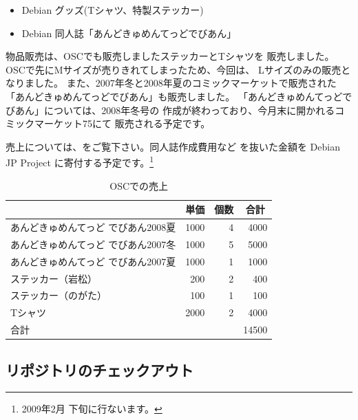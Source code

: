 \documentclass[mingoth,a4paper]{jsarticle}
\begin{document}
\begin{itemize}
 \item Debian グッズ(Tシャツ、特製ステッカー)
 \item Debian 同人誌「あんどきゅめんてっどでびあん」 
\end{itemize}

物品販売は、OSCでも販売しましたステッカーとTシャツを
販売しました。
OSCで先にMサイズが売りきれてしまったため、今回は、
Lサイズのみの販売となりました。
また、2007年冬と2008年夏のコミックマーケットで販売された
「あんどきゅめんてっどでびあん」も販売しました。
「あんどきゅめんてっどでびあん」については、2008年冬号の
作成が終わっており、今月末に開かれるコミックマーケット75にて
販売される予定です。

売上については、をご覧下さい。同人誌作成費用など
を抜いた金額を Debian JP Project に寄付する予定です。\footnote{2009年2月
下旬に行ないます。}

\begin{table}[htbp]
\caption{OSCでの売上}
\begin{center}
\begin{tabular}{|l|r|r|r|}
\hline
\multicolumn{1}{|c|}{} & \multicolumn{1}{c|}{単価} & \multicolumn{1}{c|}{個数} & \multicolumn{1}{c|}{合計} \\ \hline
あんどきゅめんてっど でびあん2008夏 & 1000 & 4 & 4000 \\ \hline
あんどきゅめんてっど でびあん2007冬 & 1000 & 5 & 5000 \\ \hline
あんどきゅめんてっど でびあん2007夏 & 1000 & 1 & 1000 \\ \hline
ステッカー（岩松） & 200 & 2 & 400 \\ \hline
ステッカー（のがた） & 100 & 1 & 100 \\ \hline
Tシャツ & 2000 & 2 & 4000 \\ \hline
合計 & \multicolumn{1}{l|}{} & \multicolumn{1}{l|}{} & 14500 \\ \hline
\end{tabular}
\end{center}
\label{uriage}
\end{table}


\subsection{リポジトリのチェックアウト}

\end{document}
